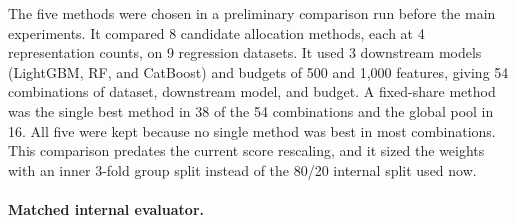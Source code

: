 The five methods were chosen in a preliminary comparison run before the main experiments. It compared 8 candidate allocation methods, each at 4 representation counts, on 9 regression datasets. It used 3 downstream models (LightGBM, RF, and CatBoost) and budgets of 500 and 1,000 features, giving 54 combinations of dataset, downstream model, and budget. A fixed-share method was the single best method in 38 of the 54 combinations and the global pool in 16. All five were kept because no single method was best in most combinations. This comparison predates the current score rescaling, and it sized the weights with an inner 3-fold group split instead of the 80/20 internal split used now.

\paragraph{Matched internal evaluator.}
